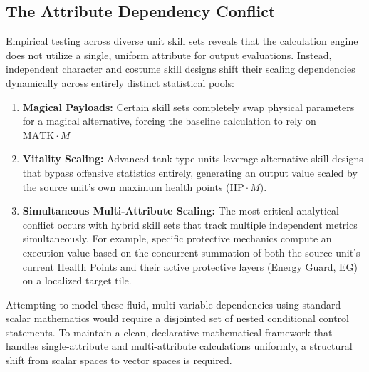 \documentclass[twocolumn,10pt]{article}
\begin{document}
\subsection{The Attribute Dependency Conflict}
Empirical testing across diverse unit skill sets reveals that the calculation engine does not utilize a single, uniform attribute for output evaluations. Instead, independent character and costume skill designs shift their scaling dependencies dynamically across entirely distinct statistical pools:
\begin{enumerate}
    \item \textbf{Magical Payloads:} Certain skill sets completely swap physical parameters for a magical alternative, forcing the baseline calculation to rely on $\text{MATK} \cdot M$
    \item \textbf{Vitality Scaling:} Advanced tank-type units leverage alternative skill designs that bypass offensive statistics entirely, generating an output value scaled by the source unit's own maximum health points ($\text{HP} \cdot M$).
    \item \textbf{Simultaneous Multi-Attribute Scaling:} The most critical analytical conflict occurs with hybrid skill sets that track multiple independent metrics simultaneously. For example, specific protective mechanics compute an execution value based on the concurrent summation of both the source unit's current Health Points and their active protective layers (Energy Guard, $\text{EG}$) on a localized target tile.
\end{enumerate}
Attempting to model these fluid, multi-variable dependencies using standard scalar mathematics would require a disjointed set of nested conditional control statements. To maintain a clean, declarative mathematical framework that handles single-attribute and multi-attribute calculations uniformly, a structural shift from scalar spaces to vector spaces is required.
\end{document}
